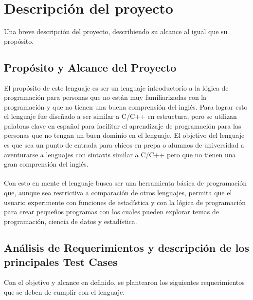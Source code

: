 \chapter{Descripción del proyecto}

Una breve descripción del proyecto, describiendo su alcance al igual que su propósito.

\section{Propósito y Alcance del Proyecto}\label{intro}
El propósito de este lenguaje es ser un lenguaje introductorio a la lógica de programación para personas que no están muy familiarizadas con la programación y que no tienen una buena comprensión del inglés. Para lograr esto el lenguaje fue diseñado a ser similar a C/C++ en estructura, pero se utilizan palabras clave en español para facilitar el aprendizaje de programación para las personas que no tengan un buen dominio en el lenguaje. El objetivo del lenguaje es que sea un punto de entrada para chicos en prepa o alumnos de universidad a aventurarse a lenguajes con sintaxis similar a C/C++ pero que no tienen una gran comprensión del inglés. \\ \\
Con esto en mente el lenguaje busca ser una herramienta básica de programación que, aunque sea restrictiva a comparación de otros lenguajes, permita que el usuario experimente con funciones de estadística y con la lógica de programación para crear pequeños programas con los cuales pueden explorar temas de programación, ciencia de datos y estadística.


\section{Análisis de Requerimientos y descripción de los principales Test Cases}

Con el objetivo y alcance en definido, se plantearon los siguientes requerimientos que se deben de cumplir con el lenguaje.


